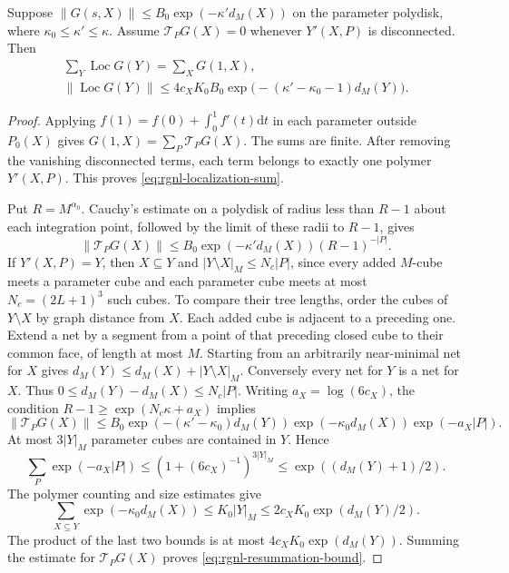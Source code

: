\documentclass[11pt,letterpaper,reqno]{amsart}
\newcommand{\dd}{\mathrm d}
\begin{document}
\begin{lemma}\label{lem:rgnl-resummation}
Suppose
$\|G(s,X)\|\le B_0\exp(-\kappa'd_M(X))$ on the parameter
polydisk, where $\kappa_0\le\kappa'\le\kappa$.
Assume $\mathcal T_PG(X)=0$ whenever $Y'(X,P)$ is
disconnected. Then
\begin{gather}
 \sum_Y\operatorname{Loc}G(Y)=\sum_XG(1,X),
                         \label{eq:rgnl-localization-sum}\\
 \|\operatorname{Loc}G(Y)\|
   \le4c_XK_0B_0
             \exp\big(-(\kappa'-\kappa_0-1)d_M(Y)\big).
                         \label{eq:rgnl-resummation-bound}
\end{gather}
\end{lemma}

\begin{proof}
Applying $f(1)=f(0)+\int_0^1f'(t)\dd t$ in each parameter
outside $P_0(X)$ gives $G(1,X)=\sum_P\mathcal T_PG(X)$.
The sums are finite. After removing the vanishing disconnected
terms, each term belongs to exactly one polymer $Y'(X,P)$.
This proves \eqref{eq:rgnl-localization-sum}.

Put $R=M^{\alpha_0}$. Cauchy's estimate on a polydisk of
radius less than $R-1$ about each integration point, followed
by the limit of these radii to $R-1$, gives
\[
 \|\mathcal T_PG(X)\|
       \le B_0\exp(-\kappa'd_M(X))(R-1)^{-|P|}.
\]
If $Y'(X,P)=Y$, then $X\subseteq Y$ and
$|Y\setminus X|_M\le N_c|P|$, since every added $M$-cube
meets a parameter cube and each parameter cube meets at
most $N_c=(2L+1)^3$ such cubes.
To compare their tree lengths, order the cubes of $Y\setminus X$
by graph distance from $X$. Each added cube is adjacent
to a preceding one. Extend a net by a segment from
a point of that preceding closed cube to their common
face, of length at most $M$. Starting from an
arbitrarily near-minimal net for $X$ gives
$d_M(Y)\le d_M(X)+|Y\setminus X|_M$.
Conversely every net for $Y$ is a net for $X$.
Thus $0\le d_M(Y)-d_M(X)\le N_c|P|$.
Writing $a_X=\log(6c_X)$, the condition
$R-1\ge\exp(N_c\kappa+a_X)$ implies
\[
 \|\mathcal T_PG(X)\|
 \le B_0\exp(-(\kappa'-\kappa_0)d_M(Y))
             \exp(-\kappa_0d_M(X))\exp(-a_X|P|).
\]
At most $3|Y|_M$ parameter cubes are contained in $Y$.
Hence
\[
 \sum_P\exp(-a_X|P|)
       \le(1+(6c_X)^{-1})^{3|Y|_M}
       \le \exp((d_M(Y)+1)/2).
\]
The polymer counting and size estimates give
\[
 \sum_{X\subseteq Y}\exp(-\kappa_0d_M(X))
   \le K_0|Y|_M
   \le2c_XK_0\exp(d_M(Y)/2).
\]
The product of the last two bounds is at most
$4c_XK_0\exp(d_M(Y))$. Summing the estimate for
$\mathcal T_PG(X)$ proves
\eqref{eq:rgnl-resummation-bound}.
\end{proof}
\end{document}
